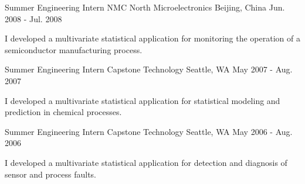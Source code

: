 \begin{cventries}
  \cventry
    {Summer Engineering Intern} %
    {NMC North Microelectronics} %
    {Beijing, China} %
    {Jun. 2008 - Jul. 2008} %
    {
      \begin{cvitems} %
        \item {I developed a multivariate statistical application for monitoring the operation of a semiconductor manufacturing process.}
      \end{cvitems}
    }

  \cventry
    {Summer Engineering Intern} %
    {Capstone Technology} %
    {Seattle, WA} %
    {May 2007 - Aug. 2007} %
    {
      \begin{cvitems} %
        \item {I developed a multivariate statistical application for statistical modeling and prediction in chemical processes.}
      \end{cvitems}
    }

  \cventry
    {Summer Engineering Intern} %
    {Capstone Technology} %
    {Seattle, WA} %
    {May 2006 - Aug. 2006} %
    {
      \begin{cvitems} %
        \item {I developed a multivariate statistical application for detection and diagnosis of sensor and process faults.}
      \end{cvitems}
    }

\end{cventries}

